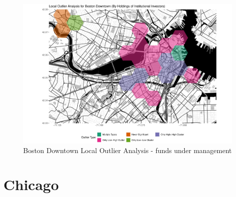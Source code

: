 \begin{figure}
	\centering
	\includegraphics[width=1\linewidth]{Figures/ChapterIV/Bos_Money_LO_Downtown}
	\caption[Boston Downtown Local Outlier Analysis - Funds Under Management 2013-2018]{Boston Downtown Local Outlier Analysis - funds under management}
	\label{fig:bostonlocaloutlier_Downtown}
\end{figure}



\section{Chicago}

